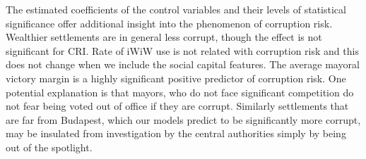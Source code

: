 The estimated coefficients of the control variables and their levels of statistical significance offer additional insight into the phenomenon of corruption risk. Wealthier settlements are in general less corrupt, though the effect is not significant for CRI. Rate of iWiW use is not related with corruption risk and this does not change when we include the social capital features. The average mayoral victory margin is a highly significant positive predictor of corruption risk. One potential explanation is that mayors, who do not face significant competition do not fear being voted out of office if they are corrupt. Similarly settlements that are far from Budapest, which our models predict to be significantly more corrupt, may be insulated from investigation by the central authorities simply by being out of the spotlight.




